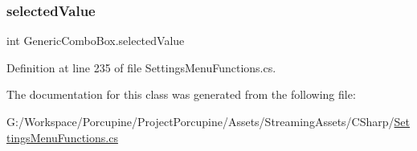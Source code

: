 \mbox{\label{class_generic_combo_box_a947c313681c753185d3f6fe4bfa0e896}} 
\subsubsection{\texorpdfstring{selected\+Value}{selectedValue}}
{\footnotesize\ttfamily int Generic\+Combo\+Box.\+selected\+Value\hspace{0.3cm}{\ttfamily [protected]}}



Definition at line 235 of file Settings\+Menu\+Functions.\+cs.



The documentation for this class was generated from the following file\+:\begin{DoxyCompactItemize}
\item 
G\+:/\+Workspace/\+Porcupine/\+Project\+Porcupine/\+Assets/\+Streaming\+Assets/\+C\+Sharp/\hyperlink{_settings_menu_functions_8cs}{Settings\+Menu\+Functions.\+cs}\end{DoxyCompactItemize}
